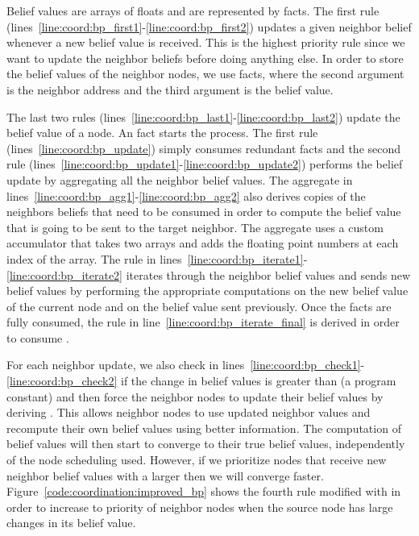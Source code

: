 \clearpage

Belief values are arrays of floats and are represented by  facts.
The first rule (lines~\ref{line:coord:bp_first1}-\ref{line:coord:bp_first2})
updates a given neighbor belief whenever a new belief value is received. This is
the highest priority rule since we want to update the neighbor beliefs before
doing anything else. In order to store the belief values of the neighbor nodes,
we use  facts, where the second argument is the neighbor
address and the third argument is the belief value.

The last two rules (lines~\ref{line:coord:bp_last1}-\ref{line:coord:bp_last2})
update the belief value of a node. An  fact starts the process.
The first rule (lines~\ref{line:coord:bp_update}) simply consumes redundant
 facts and the second rule
(lines~\ref{line:coord:bp_update1}-\ref{line:coord:bp_update2}) performs the
belief update by aggregating all the neighbor belief values. The aggregate in
lines~\ref{line:coord:bp_agg1}-\ref{line:coord:bp_agg2} also derives copies of
the neighbors beliefs that need to be consumed in order to compute the belief
value that is going to be sent to the target neighbor. The aggregate uses a
custom accumulator that takes two arrays and adds the floating point numbers at
each index of the array. The rule in
lines~\ref{line:coord:bp_iterate1}-\ref{line:coord:bp_iterate2} iterates through
the neighbor belief values and sends new belief values by performing the
appropriate computations on the new belief value of the current node and on the
belief value sent previously.  Once the facts  are
fully consumed, the rule in line~\ref{line:coord:bp_iterate_final} is derived in
order to consume .

For each neighbor update, we also check in
lines~\ref{line:coord:bp_check1}-\ref{line:coord:bp_check2} if the change in
belief values is greater than  (a program constant) and then force
the neighbor nodes to update their belief values by deriving .
This allows neighbor nodes to use updated neighbor values and recompute their
own belief values using better information. The computation of belief values
will then start to converge to their true belief values, independently of the
node scheduling used. However, if we prioritize nodes that receive new neighbor
belief values with a larger  then we will converge faster.
Figure~\ref{code:coordination:improved_bp} shows the fourth rule modified with
 in order to increase to priority of neighbor nodes when the
source node has large changes in its belief value.

